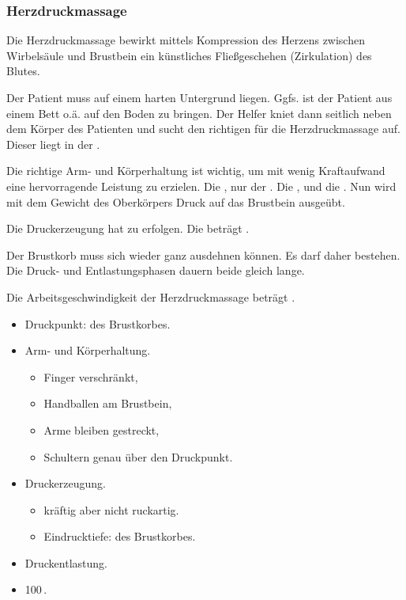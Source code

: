 \subsubsection{Herzdruckmassage}

Die Herzdruckmassage bewirkt mittels Kompression des Herzens
zwischen Wirbelsäule und Brustbein ein künstliches Fließgeschehen
(Zirkulation) des Blutes.

{
 Der Patient muss auf einem
harten Untergrund liegen. Ggfs. ist der Patient aus einem Bett
o.ä. auf den Boden zu bringen. Der Helfer kniet
dann seitlich neben dem Körper des Patienten und sucht
den richtigen  für die Herzdruckmassage
auf. Dieser liegt in der .

 Die richtige
Arm- und Körperhaltung ist wichtig, um mit wenig Kraftaufwand eine
hervorragende Leistung zu erzielen. Die , nur der .
Die , und die . Nun wird mit dem Gewicht des Oberkörpers Druck auf das Brustbein ausgeübt.

 Die
Druckerzeugung hat  zu
erfolgen. Die  beträgt .

 Der Brustkorb muss sich wieder ganz
ausdehnen können. Es darf daher  bestehen. Die Druck-
und Entlastungsphasen dauern beide gleich lange.

 Die Arbeitsgeschwindigkeit der
Herzdruckmassage beträgt .

}{
\begin{itemize}
  \item Druckpunkt:  des Brustkorbes.
  \item Arm- und Körperhaltung.
  \begin{itemize}
    \item Finger verschränkt,
    \item Handballen am Brustbein,
    \item Arme bleiben gestreckt,
    \item Schultern genau über den Druckpunkt.
  \end{itemize}
  \item Druckerzeugung.
  \begin{itemize}
    \item kräftig aber nicht ruckartig.
    \item Eindrucktiefe:  des Brustkorbes.
  \end{itemize}
  \item Druckentlastung.
  \item 100\,.
\end{itemize}
}{}{}{}

